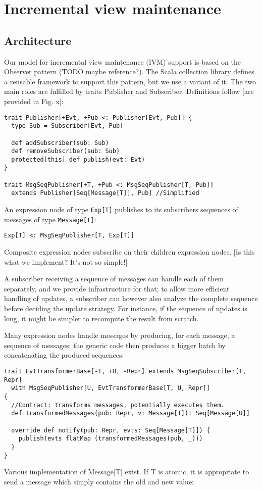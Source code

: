 \documentclass{article}
\begin{document}
\section{Incremental view maintenance}

\subsection{Architecture}

Our model for incremental view maintenance (IVM) support is based on the
Observer pattern (TODO maybe reference?). The Scala collection library
defines a reusable framework to support this pattern, but we use a
variant of it. The two main roles are fulfilled by traits Publisher and
Subscriber. Definitions follow {[}are provided in Fig. x{]}:

\begin{verbatim}
trait Publisher[+Evt, +Pub <: Publisher[Evt, Pub]] {
  type Sub = Subscriber[Evt, Pub]

  def addSubscriber(sub: Sub)
  def removeSubscriber(sub: Sub)
  protected[this] def publish(evt: Evt)
}

trait MsgSeqPublisher[+T, +Pub <: MsgSeqPublisher[T, Pub]]
  extends Publisher[Seq[Message[T]], Pub] //Simplified
\end{verbatim}
An expression node of type \texttt{Exp{[}T{]}} publishes to its
subscribers sequences of messages of type \texttt{Message{[}T{]}}:

\texttt{Exp{[}T{]} \textless{}: MsgSeqPublisher{[}T, Exp{[}T{]}{]}}

Composite expression nodes subscribe on their children expression nodes.
{[}Is this what we implement? It's not so simple!{]}

A subscriber receiving a sequence of messages can handle each of them
separately, and we provide infrastructure for that; to allow more
efficient handling of updates, a subscriber can however also analyze the
complete sequence before deciding the update strategy. For instance, if
the sequence of updates is long, it might be simpler to recompute the
result from scratch.

Many expression nodes handle messages by producing, for each message, a
sequence of messages; the generic code then produces a bigger batch by
concatenating the produced sequences:

\begin{verbatim}
trait EvtTransformerBase[-T, +U, -Repr] extends MsgSeqSubscriber[T, Repr]
  with MsgSeqPublisher[U, EvtTransformerBase[T, U, Repr]]
{
  //Contract: transforms messages, potentially executes them.
  def transformedMessages(pub: Repr, v: Message[T]): Seq[Message[U]]

  override def notify(pub: Repr, evts: Seq[Message[T]]) {
    publish(evts flatMap (transformedMessages(pub, _)))
  }
}
\end{verbatim}
Various implementation of Message{[}T{]} exist. If T is atomic, it is
appropriate to send a message which simply contains the old and new
value:
\end{document}
